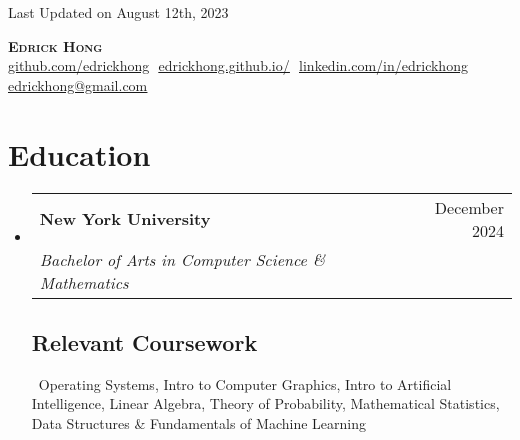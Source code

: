 \documentclass[letterpaper,11pt]{article}
\makeatletter
\newcommand{\resumeSubheading}[4]{
  \vspace{-2pt}\item
    \begin{tabular*}{0.97\textwidth}[t]{l@{\extracolsep{\fill}}r}
      \textbf{#1} & #2 \\
      \textit{\small#3} & \textit{\small #4} \\
    \end{tabular*}\vspace{-7pt}
}
\newcommand{\resumeSubHeadingListStart}{\begin{itemize}[leftmargin=0.15in, label={}]}
\newcommand{\resumeSubHeadingListEnd}{\end{itemize}}
\makeatother
\begin{document}
\begin{flushright}
  \vspace{-4pt}
  \color{gray}
  \item
  Last Updated on August 12th, 2023
\end{flushright}

\vspace{-7pt}

\begin{center}
    \textbf{\Huge \scshape Edrick Hong} \\ \vspace{8pt}
    \small 
    \href{https://github.com/edrickhong}{\underline{github.com/edrickhong}} $  $
    \href{https://github.com/edrickhong/project_pages/wiki} %
    {\underline{edrickhong.github.io/}} $  $
    \href{https://www.linkedin.com/in/edrick-hong-966abb244/}{\underline{linkedin.com/in/edrickhong}} $  $ %
    \href{mailto:edrickhong@gmail.com}
    {\underline{edrickhong@gmail.com}}
\end{center}

\section{Education}
  \resumeSubHeadingListStart
  
    \resumeSubheading
      {New York University}{December 2024}
      {Bachelor of Arts in Computer Science \& Mathematics}{}

    \vspace{-10pt}
    \subsection{Relevant Coursework}
      \ Operating Systems, Intro to Computer Graphics, Intro to Artificial Intelligence, Linear Algebra, Theory of Probability, Mathematical Statistics, Data Structures \& Fundamentals of Machine Learning\

  \resumeSubHeadingListEnd

\end{document}
